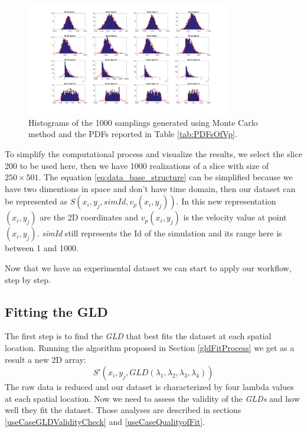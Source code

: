 \begin{figure}[ht]
    \centering
    \includegraphics[width=0.8\textwidth]{images/vp_1000_realizations.png}
    \caption{Histograms of the 1000 samplings generated using Monte Carlo method and the PDFs reported in Table \ref{tab:PDFsOfVp}.}
    \label{fig:vp_1000_realizations}
\end{figure}

To simplify the computational process and visualize the results, we select the slice 200 to be used here, then we have 1000 realizations of a slice with size of $250\times501$. The equation \ref{eq:data_base_structure} can be simplified because we have two dimentions in space and don't have time domain, then our dataset can be represented as $S(x_{i},y_{j},simId,v_{p}(x_{i},y_{j}))$. In this new representation $(x_{i},y_{j})$ are the 2D coordinates and $v_{p}(x_{i},y_{j})$ is the velocity value at point $(x_{i},y_{j})$. \textit{simId} still represents the Id of the simulation and its range here is between 1 and 1000.

Now that we have an experimental dataset we can start to apply our workflow, step by step.

\subsection{Fitting the GLD}
The first step is to find the \textit{GLD} that best fits the dataset at each spatial location. Running the algorithm proposed in Section \ref{gldFitProcess} we get as a result a new 2D array:
\begin{equation}\label{eq:gld_fit_2D}
S'(x_{i},y_{j},GLD(\lambda_{1}, \lambda_{2}, \lambda_{3}, \lambda_{4}))
\end{equation}
The raw data is reduced and our dataset is characterized by four lambda values at each spatial location. Now we need to assess the validity of the \textit{GLDs} and how well they fit the dataset. Those analyses are described in sections \ref{useCaseGLDValidityCheck} and \ref{useCaseQualityofFit}. 

